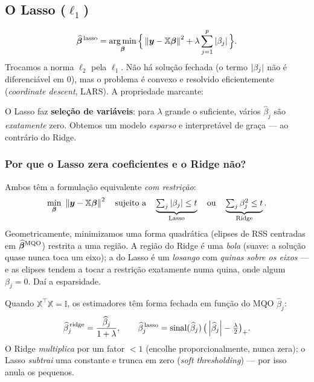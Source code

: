 \documentclass[11pt,a4paper]{article}
\begin{document}
\subsection{O Lasso ($\ell_1$)}
\begin{equation}\label{eq:lasso}
  \widehat{\bbeta}^{\,\text{lasso}}
   = \argmin_{\bbeta}\Big\{ \norm{\bm{y}-\mathbb{X}\bbeta}^2
       + \lambda \sum_{j=1}^{p}\abs{\beta_j} \Big\}.
\end{equation}
Trocamos a norma $\ell_2$ pela $\ell_1$. Não há solução fechada (o termo
$\left\lvert \beta_j \right\rvert$ não é diferenciável em $0$), mas o problema é convexo e resolvido
eficientemente (\emph{coordinate descent}, LARS). A propriedade marcante:

\begin{ideia}
O Lasso faz \textbf{seleção de variáveis}: para $\lambda$ grande o suficiente,
vários $\widehat\beta_j$ são \emph{exatamente} zero. Obtemos um modelo
\emph{esparso} e interpretável de graça --- ao contrário do Ridge.
\end{ideia}

\subsubsection*{Por que o Lasso zera coeficientes e o Ridge não?}
Ambos têm a formulação equivalente \emph{com restrição}:
\[
  \min_{\bm{\beta}}\ \left\lVert \bm{y}-\mathbb{X}\bm{\beta} \right\rVert^2
  \quad\text{sujeito a}\quad
  \underbrace{\textstyle\sum_j\left\lvert \beta_j \right\rvert\le t}_{\text{Lasso}}
  \quad\text{ou}\quad
  \underbrace{\textstyle\sum_j\beta_j^2\le t}_{\text{Ridge}}.
\]
Geometricamente, minimizamos uma forma quadrática (elipses de RSS centradas em
$\widehat{\bm{\beta}}^{\text{MQO}}$) restrita a uma região. A região do Ridge é uma
\emph{bola} (suave: a solução quase nunca toca um eixo); a do Lasso é um
\emph{losango} com \emph{quinas sobre os eixos} --- e as elipses tendem a tocar a
restrição exatamente numa quina, onde algum $\beta_j=0$. Daí a esparsidade.

\begin{exemplo}
Quando $\mathbb{X}^\top\mathbb{X}=\mathbb{I}$, os estimadores têm forma fechada em função do
MQO $\widehat\beta_j$:
\[
  \widehat\beta_j^{\,\text{ridge}} = \frac{\widehat\beta_j}{1+\lambda},
  \qquad
  \widehat\beta_j^{\,\text{lasso}}
     = \operatorname{sinal}(\widehat\beta_j)\,\big(\left\lvert \widehat\beta_j \right\rvert-\tfrac{\lambda}{2}\big)_+ .
\]
O Ridge \emph{multiplica} por um fator $<1$ (encolhe proporcionalmente, nunca
zera); o Lasso \emph{subtrai} uma constante e trunca em zero (\emph{soft
thresholding}) --- por isso anula os pequenos.
\end{exemplo}
\end{document}
